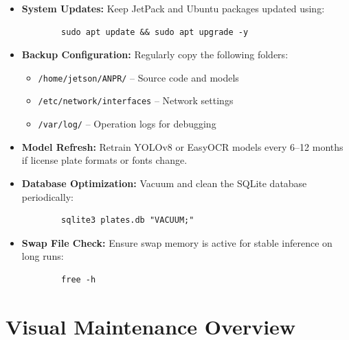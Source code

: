 \begin{itemize}
	\item \textbf{System Updates:} Keep JetPack and Ubuntu packages updated using:
	\begin{verbatim}
		sudo apt update && sudo apt upgrade -y
	\end{verbatim}
	
	\item \textbf{Backup Configuration:} Regularly copy the following folders:
	\begin{itemize}
		\item \texttt{/home/jetson/ANPR/} – Source code and models
		\item \texttt{/etc/network/interfaces} – Network settings
		\item \texttt{/var/log/} – Operation logs for debugging
	\end{itemize}
	
	\item \textbf{Model Refresh:} Retrain YOLOv8 or EasyOCR models every 6–12 months if license plate formats or fonts change.
	\item \textbf{Database Optimization:} Vacuum and clean the SQLite database periodically:
	\begin{verbatim}
		sqlite3 plates.db "VACUUM;"
	\end{verbatim}
	\item \textbf{Swap File Check:} Ensure swap memory is active for stable inference on long runs:
	\begin{verbatim}
		free -h
	\end{verbatim}
\end{itemize}

\section{Visual Maintenance Overview}

